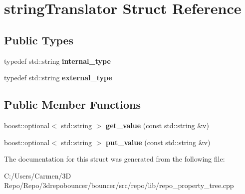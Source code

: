 \hypertarget{structstring_translator}{}\section{string\+Translator Struct Reference}
\label{structstring_translator}
\subsection*{Public Types}
\begin{DoxyCompactItemize}
\item 
\hypertarget{structstring_translator_af22f5446dd307575b42420692bca063a}{}typedef std\+::string {\bfseries internal\+\_\+type}\label{structstring_translator_af22f5446dd307575b42420692bca063a}

\item 
\hypertarget{structstring_translator_a4cecd98448d6b6971e09ade724f3b41f}{}typedef std\+::string {\bfseries external\+\_\+type}\label{structstring_translator_a4cecd98448d6b6971e09ade724f3b41f}

\end{DoxyCompactItemize}
\subsection*{Public Member Functions}
\begin{DoxyCompactItemize}
\item 
\hypertarget{structstring_translator_adef9b443ff09a37aa80c30c8707d3f90}{}boost\+::optional$<$ std\+::string $>$ {\bfseries get\+\_\+value} (const std\+::string \&v)\label{structstring_translator_adef9b443ff09a37aa80c30c8707d3f90}

\item 
\hypertarget{structstring_translator_a04c31dd5772f633ab0d12ca2e2d9aaea}{}boost\+::optional$<$ std\+::string $>$ {\bfseries put\+\_\+value} (const std\+::string \&v)\label{structstring_translator_a04c31dd5772f633ab0d12ca2e2d9aaea}

\end{DoxyCompactItemize}


The documentation for this struct was generated from the following file\+:\begin{DoxyCompactItemize}
\item 
C\+:/\+Users/\+Carmen/3\+D Repo/\+Repo/3drepobouncer/bouncer/src/repo/lib/repo\+\_\+property\+\_\+tree.\+cpp\end{DoxyCompactItemize}
